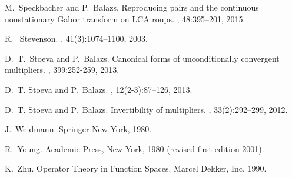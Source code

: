 \documentclass{birkjour}
\theoremstyle{definition}
\theoremstyle{remark}
\numberwithin{equation}{section}
\begin{document}
\begin{thebibliography}{10}
M.~Speckbacher and P.~Balazs.
\newblock Reproducing pairs and the continuous nonstationary {G}abor transform on LCA roups.
, 48:395--201, 2015.


R.~ Stevenson. 
, 41(3):1074--1100, 2003.






D.~T.~Stoeva and P.~Balazs.
\newblock Canonical forms of unconditionally convergent multipliers.
, 399:252-259, 2013. 


D.~T. Stoeva and P.~Balazs.
, 12(2-3):87--126, 2013.



D.~T. Stoeva and P.~Balazs.
\newblock Invertibility of multipliers.
, 33(2):292--299, 2012.



J.~Weidmann.
\newblock Springer New York, 1980.


R.~Young.
\newblock Academic Press, New York, 1980 (revised first edition 2001).


K.~Zhu.
\newblock Operator Theory in Function Spaces.
\newblock Marcel Dekker, Inc, 1990.

\end{thebibliography}
\end{document}
